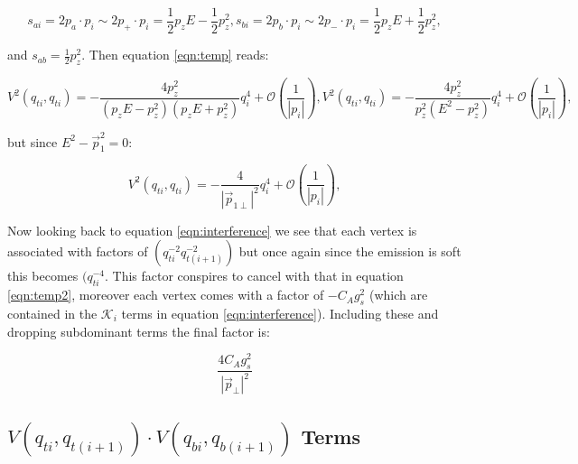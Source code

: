 			\begin{subequations}
			\begin{equation}
			s_{ai} = 2p_a\cdot p_i\sim2p_+\cdot p_i = \frac12p_zE - \frac12p_z^2,
			\end{equation}
			\begin{equation}
			s_{bi} = 2p_b\cdot p_i\sim2p_-\cdot p_i = \frac12p_zE + \frac12p_z^2,
			\end{equation}
			\end{subequations}

			and $s_{ab}=\frac12p_z^2$.  Then equation \ref{eqn:temp} reads:

			\begin{subequations}
			\begin{equation}
			V^2(q_{ti}, q_{ti}) = - \frac{4p_z^2}{(p_zE - p_z^2)(p_zE + p_z^2)}q^4_{i} + \mathcal{O}\left(\frac{1}{|p_i|}\right),
			\end{equation}
			\begin{equation}
			V^2(q_{ti}, q_{ti}) = - \frac{4p_z^2}{p_z^2(E^2-p_z^2)}q^4_{i} + \mathcal{O}\left(\frac{1}{|p_i|}\right),
			\end{equation}
			\end{subequations}

			but since $E^2-\vec{p}_1^2=0$:

			\begin{equation}
			V^2(q_{ti}, q_{ti}) = - \frac{4}{|\vec{p}_{1\perp}|^2}q^4_{i} + \mathcal{O}\left(\frac{1}{|p_i|}\right),
			\label{eqn:temp2}
			\end{equation}

			Now looking back to equation \ref{eqn:interference} we see that each vertex is associated with factors of $(q^{-2}_{ti}q^{-2}_{t(i+1)})$ but once again since the emission is soft this becomes $(q^{-4}_{ti}$.  This factor conspires to cancel with that in equation \ref{eqn:temp2}, moreover each vertex comes with a factor of $-C_Ag^2_s$ (which are contained in the $\mathcal{K}_i$ terms in equation \ref{eqn:interference}).  Including these and dropping subdominant terms the final factor is:

			\begin{equation}
			\frac{4C_Ag_s^2}{|\vec{p}_\perp|^2}
			\label{eqn:finalsoft}
			\end{equation}

		\subsection{$V(q_{ti}, q_{t(i+1)})\cdot V(q_{bi}, q_{b(i+1)})$ Terms}
		\label{sub:subsection_name}

